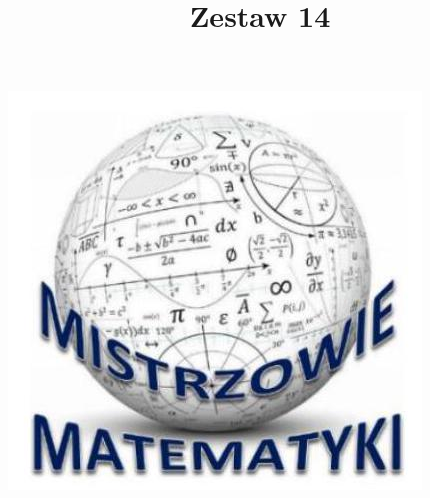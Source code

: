 \documentclass[10pt]{article}
\title{Zestaw 14 }
\author{}
\date{}
\begin{document}
\maketitle
\begin{center}
\includegraphics[max width=\textwidth]{2024_11_21_a3b3d3b4a87def3715fbg-1(1)}
\end{center}
\end{document}
